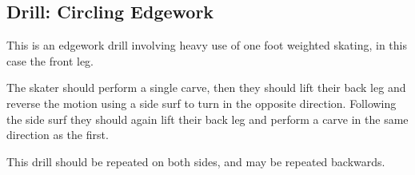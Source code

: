 \subsection*{Drill: Circling Edgework}
This is an edgework drill involving heavy use of one foot weighted skating, in this case the front leg.


The skater should perform a single carve, then they should lift their back leg and reverse the motion using a side surf to turn in the opposite direction.
Following the side surf they should again lift their back leg and perform a carve in the same direction as the first.


This drill should be repeated on both sides, and may be repeated backwards.
